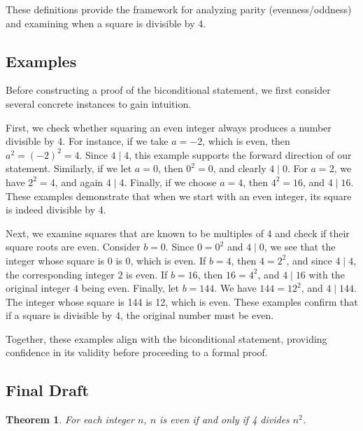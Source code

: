 \documentclass[12pt]{article}
\newtheorem*{theorem}{Theorem}
\theoremstyle{definition}
\begin{document}
These definitions provide the framework for analyzing parity (evenness/oddness) and examining when a square is divisible by 4.

\subsection{Examples} 

Before constructing a proof of the biconditional statement, we first consider several concrete instances to gain intuition.

First, we check whether squaring an even integer always produces a number divisible by 4. For instance, if we take \(a = -2\), which is even, then \(a^2 = (-2)^2 = 4\). Since \(4 \mid 4\), this example supports the forward direction of our statement. Similarly, if we let \(a = 0\), then \(0^2 = 0\), and clearly \(4 \mid 0\). For \(a = 2\), we have \(2^2 = 4\), and again \(4 \mid 4\). Finally, if we choose \(a = 4\), then \(4^2 = 16\), and \(4 \mid 16\). These examples demonstrate that when we start with an even integer, its square is indeed divisible by 4.

Next, we examine squares that are known to be multiples of 4 and check if their square roots are even. Consider \(b = 0\). Since \(0 = 0^2\) and \(4 \mid 0\), we see that the integer whose square is 0 is \(0\), which is even. If \(b = 4\), then \(4 = 2^2\), and since \(4 \mid 4\), the corresponding integer \(2\) is even. If \(b = 16\), then \(16 = 4^2\), and \(4 \mid 16\) with the original integer \(4\) being even. Finally, let \(b = 144\). We have \(144 = 12^2\), and \(4 \mid 144\). The integer whose square is 144 is 12, which is even. These examples confirm that if a square is divisible by 4, the original number must be even.

Together, these examples align with the biconditional statement, providing confidence in its validity before proceeding to a formal proof.

\newpage

\subsection{Final Draft}

\begin{theorem}
    For each integer \( n \), \( n \) is even if and only if 4 divides \( n^2 \).
\end{theorem}
\end{document}

